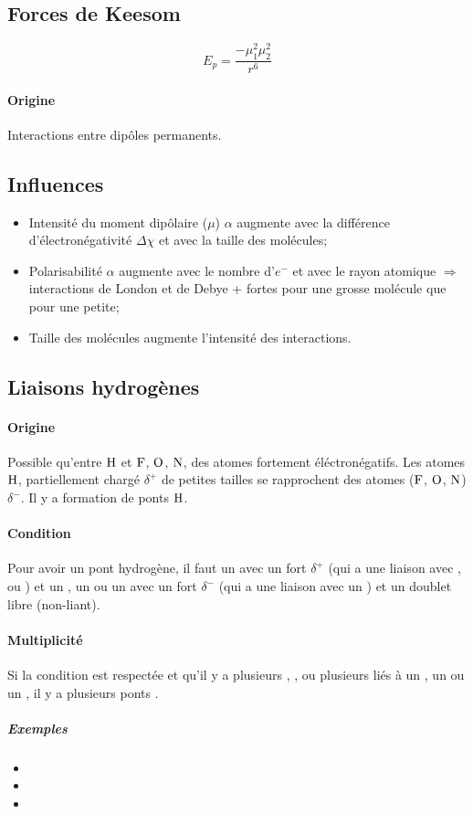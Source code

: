 \subsection{Forces de Keesom}
\[ E_p = \frac{-\mu_1^2 \mu_2^2}{r^6} \]

\paragraph{Origine}
Interactions entre dipôles permanents.

\subsection{Influences}

\begin{itemize}
  \item Intensité du moment dipôlaire ($\mu$)
    $\alpha$ augmente avec la différence d'électronégativité $\Delta\chi$ et avec la taille des molécules;
  \item Polarisabilité
    $\alpha$ augmente avec le nombre d'$e^-$ et avec le rayon atomique
    $\Rightarrow$ interactions de London et de Debye + fortes pour une grosse molécule que pour une petite;
  \item Taille des molécules augmente l'intensité des interactions.
\end{itemize}

\subsection{Liaisons hydrogènes}
\paragraph{Origine}
Possible qu'entre $\ce{H}$ et $\ce{F}$,
$\ce{O}$, $\ce{N}$, des atomes fortement éléctronégatifs.
Les atomes $\ce{H}$,
partiellement chargé $\delta^+$ de petites tailles se rapprochent des atomes ($\ce{F}$, $\ce{O}$, $\ce{N}$) $\delta^-$.
Il y a formation de ponts $\ce{H}$.
\paragraph{Condition}
Pour avoir un pont hydrogène, il faut un  avec un fort $\delta^+$ (qui a une liaison avec ,  ou ) et un , un  ou un  avec un fort $\delta^-$ (qui a une liaison avec un ) et un doublet libre (non-liant).
\paragraph{Multiplicité}
Si la condition est respectée et qu'il y a plusieurs , ,  ou plusieurs  liés à un , un  ou un , il y a plusieurs ponts .
\subparagraph{Exemples}
\begin{itemize}
  \item {}
  \item {}
  \item {}
\end{itemize}

